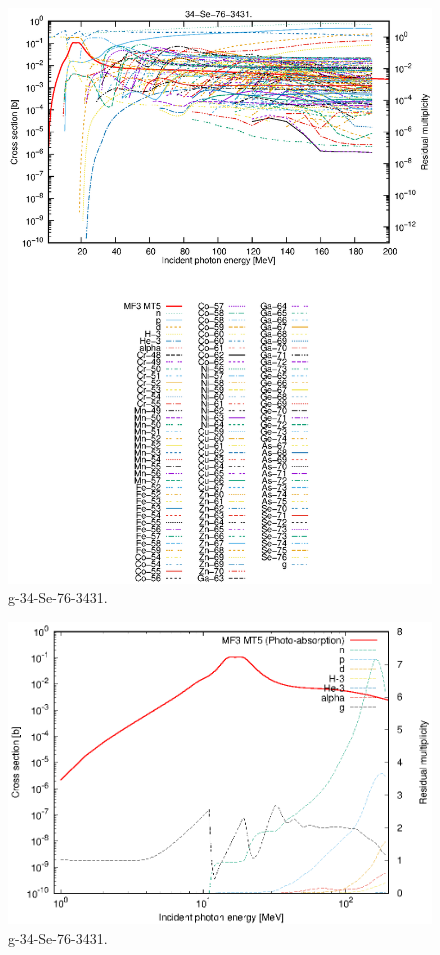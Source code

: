 \begin{figure}
 \includegraphics[width=\linewidth]{eps/g_34-Se-76_3431.eps}
  \caption{g-34-Se-76-3431.}
\end{figure}
\newpage \clearpage

\begin{figure}
 \includegraphics[width=\linewidth]{eps-log/g_34-Se-76_3431.eps}
 \caption{g-34-Se-76-3431.}
\end{figure}
\newpage \clearpage

